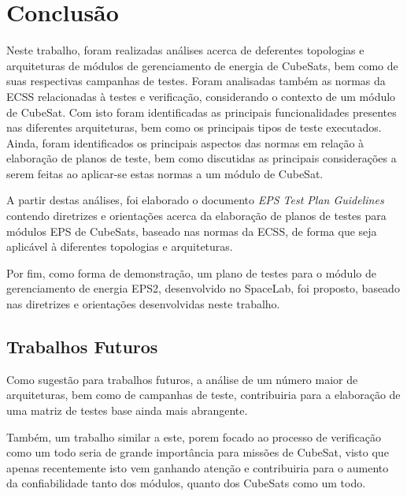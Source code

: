 \chapter{Conclusão}

Neste trabalho, foram realizadas análises acerca de deferentes topologias e arquiteturas de módulos de gerenciamento de energia de CubeSats, bem como de suas respectivas campanhas de testes. Foram analisadas também as normas da \gls{ECSS} relacionadas à testes e verificação, considerando o contexto de um módulo de CubeSat. Com isto foram identificadas as principais funcionalidades presentes nas diferentes arquiteturas, bem como os principais tipos de teste executados. Ainda, foram identificados os principais aspectos das normas em relação à elaboração de planos de teste, bem como discutidas as principais considerações a serem feitas ao aplicar-se estas normas a um módulo de CubeSat.

A partir destas análises, foi elaborado o documento \textit{EPS Test Plan Guidelines} contendo diretrizes e orientações acerca da elaboração de planos de testes para módulos \gls{EPS} de CubeSats, baseado nas normas da \gls{ECSS}, de forma que seja aplicável à diferentes topologias e arquiteturas.

Por fim, como forma de demonstração, um plano de testes para o módulo de gerenciamento de energia \gls{EPS2}, desenvolvido no SpaceLab, foi proposto, baseado nas diretrizes e orientações desenvolvidas neste trabalho.

\section{Trabalhos Futuros}

Como sugestão para trabalhos futuros, a análise de um número maior de arquiteturas, bem como de campanhas de teste, contribuiria para a elaboração de uma matriz de testes base ainda mais abrangente.

Também, um trabalho similar a este, porem focado ao processo de verificação como um todo seria de grande importância para missões de CubeSat, visto que apenas recentemente isto vem ganhando atenção e contribuiria para o aumento da confiabilidade tanto dos módulos, quanto dos CubeSats como um todo.